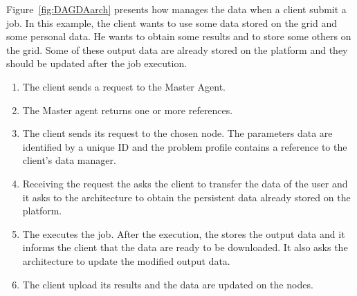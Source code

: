 Figure~\ref{fig:DAGDAarch} presents how \dagda manages the data when a
client submit a job. In this example, the client wants to use some
data stored on the grid and some personal data. He wants to obtain
some results and to store some others on the grid. Some of these
output data are already stored on the platform and they should be
updated after the job execution.
\begin{enumerate}
  \item The client sends a request to the Master Agent.
  \item The Master agent returns one or more \sed references.
  \item The client sends its request to the chosen node. The
    parameters data are identified by a unique ID and the problem
    profile contains a reference to the client's data manager.
  \item Receiving the request the \sed asks the client to transfer the
    data of the user and it asks to the \dagda architecture to obtain
    the persistent data already stored on the platform.
  \item The \sed executes the job. After the execution, the \sed stores
    the output data and it informs the client that the data are ready
    to be downloaded. It also asks the architecture to update the
    modified output data.
  \item The client upload its results and the data are updated on the
    nodes.
\end{enumerate}

